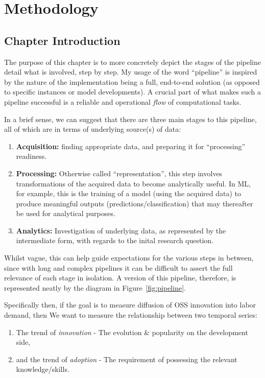 \chapter{Methodology}

\section{Chapter Introduction}

The purpose of this chapter is to more concretely depict the stages of the pipeline detail what is involved, step by step.
My usage of the word ``pipeline'' is inspired by the nature of the implementation being a full, end-to-end solution (as opposed to specific instances or model developments).
A crucial part of what makes such a pipeline successful is a reliable and operational \emph{flow} of computational tasks.

In a brief sense, we can suggest that there are three main stages to this pipeline, all of which are in terms of underlying source(s) of data:
\begin{enumerate}
    \item \textbf{Acquisition:} finding appropriate data, and preparing it for ``processing'' readiness.
    \item \textbf{Processing:} Otherwise called ``representation'', this step involves transformations of the acquired data to become analytically useful. In ML, for example, this is the training of a model (using the acquired data) to produce meaningful outputs (predictions/classification) that may thereafter be used for analytical purposes.
    \item \textbf{Analytics:} Investigation of underlying data, as represented by the intermediate form, with regards to the inital research question.
\end{enumerate}

Whilst vague, this can help guide expectations for the various steps in between, since with long and complex pipelines it can be difficult to assert the full relevance of each stage in isolation.
A version of this pipeline, therefore, is represented neatly by the diagram in Figure~\ref{fig:pipeline}.


Specifically then, if the goal is to measure diffusion of OSS innovation into labor demand, then We want to measure the relationship between two temporal series:
\begin{enumerate}
    \item The trend of \emph{innovation} - The evolution \& popularity on the development side,
    \item and the trend of \emph{adoption} - The requirement of possessing the relevant knowledge/skills.
\end{enumerate}

